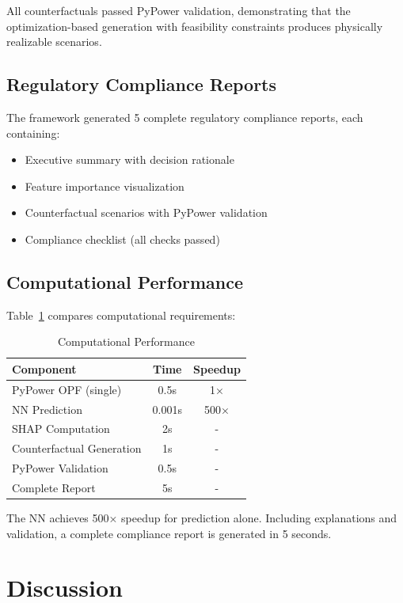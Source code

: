 \documentclass[journal,12pt,onecolumn]{IEEEtran}
\begin{document}
All counterfactuals passed PyPower validation, demonstrating that the optimization-based generation with feasibility constraints produces physically realizable scenarios.

\subsection{Regulatory Compliance Reports}

The framework generated 5 complete regulatory compliance reports, each containing:
\begin{itemize}
    \item Executive summary with decision rationale
    \item Feature importance visualization
    \item Counterfactual scenarios with PyPower validation
    \item Compliance checklist (all checks passed)
\end{itemize}

\subsection{Computational Performance}

Table~\ref{tab:computation} compares computational requirements:

\begin{table}[htbp]
\caption{Computational Performance}
\label{tab:computation}
\centering
\begin{tabular}{lcc}
\toprule
\textbf{Component} & \textbf{Time} & \textbf{Speedup} \\
\midrule
PyPower OPF (single) & 0.5s & 1× \\
NN Prediction & 0.001s & 500× \\
SHAP Computation & 2s & - \\
Counterfactual Generation & 1s & - \\
PyPower Validation & 0.5s & - \\
Complete Report & 5s & - \\
\bottomrule
\end{tabular}
\end{table}

The NN achieves 500× speedup for prediction alone. Including explanations and validation, a complete compliance report is generated in 5 seconds.

\section{Discussion}
\label{sec:discussion}
\end{document}
